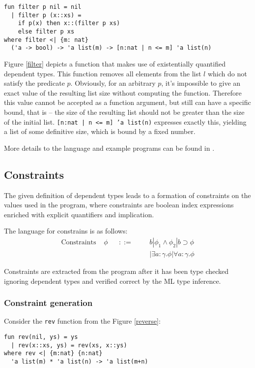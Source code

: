 \documentclass[a4paper,UKenglish]{lipics-v2016}
\begin{document}
\begin{lstlisting}[caption={The filter function for lists},label=filter,captionpos=t,float,abovecaptionskip=-\medskipamount]
fun filter p nil = nil
  | filter p (x::xs) =
    if p(x) then x::(filter p xs)
    else filter p xs
where filter <| {m: nat}
  ('a -> bool) -> 'a list(m) -> [n:nat | n <= m] 'a list(n)
\end{lstlisting}

Figure \ref{filter} depicts a function that makes use of existentially
quantified dependent types. This function removes all elements from the list
$l$ which do not satisfy the predicate $p$. Obviously, for an arbitrary $p$,
it's impossible to give an exact value of the resulting list size without
computing the function. Therefore this value cannot be accepted as a function
argument, but still can have a specific bound, that is -- the size of the
resulting list should not be greater than the size of the initial list.
\texttt{[n:nat | n <= m] 'a list(n)} expresses exactly this, yielding a list of
some definitive size, which is bound by a fixed number.

More details to the language and example programs can be found in
\cite{Xi:1998}\cite{XiPhd:1998}.

\subsection{Constraints}

The given definition of dependent types leads to a formation of constraints on
the values used in the program, where constraints are boolean index expressions
enriched with explicit quantifiers and implication.

The language for constrains is as follows:
\begin{align*}
  \text{Constraints } &\phi &&::= &&&b | \phi_1 \land \phi_2 | b \supset \phi\\
                      &     &&    &&&| \exists a : \gamma. \phi | \forall a : \gamma. \phi
\end{align*}

Constraints are extracted from the program after it has been type checked
ignoring dependent types and verified correct by the ML type inference.

\subsubsection{Constraint generation}

Consider the \texttt{rev} function from the Figure \ref{reverse}:
\begin{verbatim}
fun rev(nil, ys) = ys
  | rev(x::xs, ys) = rev(xs, x::ys)
where rev <| {m:nat} {n:nat}
  'a list(m) * 'a list(n) -> 'a list(m+n)
\end{verbatim}
\end{document}
